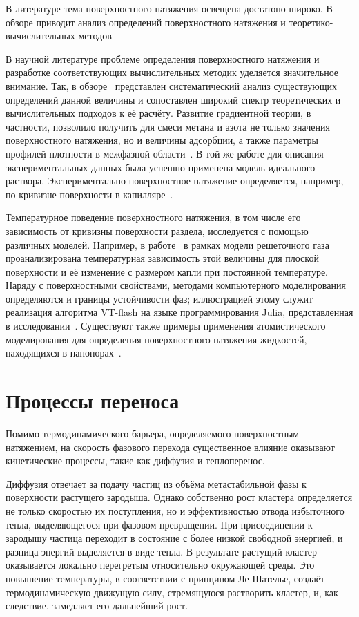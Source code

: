 В литературе тема поверхностного натяжения освещена достатоно широко. В обзоре приводит анализ определений поверхностного натяжения и теоретико-вычислительных методов  

В научной литературе проблеме определения поверхностного натяжения и разработке соответствующих вычислительных методик уделяется значительное внимание. Так, в обзоре~\cite{Tovbin_2018} представлен систематический анализ существующих определений данной величины и сопоставлен широкий спектр теоретических и вычислительных подходов к её расчёту. Развитие градиентной теории, в частности, позволило получить для смеси метана и азота не только значения поверхностного натяжения, но и величины адсорбции, а также параметры профилей плотности в межфазной области~\cite{baidakov_surface_2016}. В той же работе для описания экспериментальных данных была успешно применена модель идеального раствора. Экспериментально поверхностное натяжение определяется, например, по кривизне поверхности в капилляре~\cite{kaverin2006}. 

Температурное поведение поверхностного натяжения, в том числе его зависимость от кривизны поверхности раздела, исследуется с помощью различных моделей. Например, в работе~\cite{tovbin_2022} в рамках модели решеточного газа проанализирована температурная зависимость этой величины для плоской поверхности и её изменение с размером капли при постоянной температуре. Наряду с поверхностными свойствами, методами компьютерного моделирования определяются и границы устойчивости фаз; иллюстрацией этому служит реализация алгоритма VT-flash на языке программирования Julia, представленная в исследовании~\cite{zakharov_cubiceosjl_2023}. Существуют также примеры применения атомистического моделирования для определения поверхностного натяжения жидкостей, находящихся в нанопорах~\cite{Rivera_2015}.


\section{Процессы переноса}

Помимо термодинамического барьера, определяемого поверхностным натяжением, на скорость фазового перехода существенное влияние оказывают кинетические процессы, такие как диффузия и теплоперенос.

Диффузия отвечает за подачу частиц из объёма метастабильной фазы к поверхности растущего зародыша. Однако собственно рост кластера определяется не только скоростью их поступления, но и эффективностью отвода избыточного тепла, выделяющегося при фазовом превращении. При присоединении к зародышу частица переходит в состояние с более низкой свободной энергией, и разница энергий выделяется в виде тепла. В результате растущий кластер оказывается локально перегретым относительно окружающей среды. Это повышение температуры, в соответствии с принципом Ле Шателье, создаёт термодинамическую движущую силу, стремящуюся растворить кластер, и, как следствие, замедляет его дальнейший рост.

